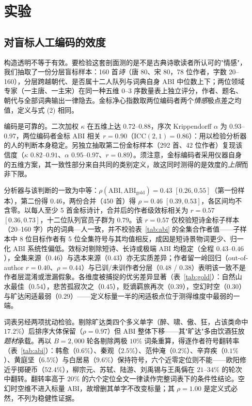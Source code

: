 \documentclass[11pt]{article}
\begin{document}
\section{实验}
\label{sec:profiles}

\subsection{对盲标人工编码的效度}
\label{sec:gold}

构造透明不等于有效。要检验这套剖面测的是不是古典诗歌读者所认可的"情感"，我们抽取了一份分层盲标样本：160 首\emph{诗}（唐 80、宋 80，78 位作者，字数 20–160），分层跨越朝代、是否属十二人队列与词典自身 ABI 中位数上下；两位领域专家（一主唐、一主宋）在同一种五维 0–3 序数量表上独立评分，作者、题名、朝代与全部词典输出一律隐去。金标净心指数取两位编码者两个\emph{情感}极点差之均值，定义与式 (2) 相同。

编码是可靠的。二次加权 $\kappa$ 在五维上达 $0.72$–$0.88$，序次 Krippendorff $\alpha$ 为 $0.93$–$0.97$，两位编码者金标 ABI 相关 $r{=}0.90$（ICC$(2,1){=}0.86$）：用以检验分析器的人的判断本身稳定。另独立抽取第二份金标样本（292 首、42 位作者）复现该信度（$\kappa$ $0.82$–$0.91$、$\alpha$ $0.95$–$0.97$、$r{=}0.89$）。须注意，金标编码者采用仪器自身的五维方案，其一致性部分来自共同的类别定义，故这同时测得的是效度的\emph{上限}而非下限。

分析器与该判断的一致为中等：$\rho(\mathrm{ABI},\mathrm{ABI}_{\mathrm{gold}}){=}0.43$ $[0.26,0.55]$（第一份样本），第二份得 $0.46$，两份合并（$450$ 首）得 $\rho{=}0.46$ $[0.39,0.53]$，各区间均不含零。以每人至少 5 首金标诗计，合并后的作者级效标相关为 $r{=}0.57$ $[0.36,0.73]$，十二位队列官员子群为 $0.79$。该 $r{=}0.57$ 仅校验短诗金标子样本（20–160 字）内的词典—人一致，并不校验表~\ref{tab:abi} 的全集合作者值——子样本中 8 位目标作者有 5 位全集符号与其均值相反，成因是短诗景物词更少、归一化 ABI 系统性偏低。效标对剔除短诗、长诗或极端 ABI 均稳定（全程 $0.43$–$0.46$），全集来源（$0.46$）与选本来源（$0.43$）亦无实质差异；作者留一岭回归（out-of-author $r{=}0.40$、$\rho{=}0.44$）与已训/未训作者分层（$0.48$ / $0.38$）表明该一致不是作者层混淆或泄漏假象。各维度被捕捉的优劣差异显著（表~\ref{tab:gold}）：自然山水最佳（$0.54$），悲苦孤寂次之（$0.45$），贬谪羁旅再次（$0.39$），空幻时空（$0.30$）与旷达闲适最弱（$0.29$）——定义标量一半的闲适极点位于测得维度中最弱的一端。

词表另经两项扰动检验。剔除旷达类四个多义单字（醉、啸、傲、狂，占该类命中 $17.2\%$）后排序大体保留（$\rho{=}0.97$）但 ABI 整体下移——其"旷达"多由饮酒狂放\emph{题材}承载。再以 $B{=}2{,}000$ 轮各剔除两极 $10\%$ 词条重算，得逐作者符号翻转率（表~\ref{tab:abi}）：韩愈（$0.6\%$）、秦观（$2.5\%$）、范仲淹（$0.2\%$）、辛弃疾（$0.1\%$）、黄庭坚（$6.5\%$）与白居易（$9.6\%$）保持符号，六个近零定位则不能——欧阳修近乎掷硬币（$52.4\%$），柳宗元、苏轼、陆游、刘禹锡与王禹偁在 $21$–$34\%$ 的轮次中翻转。翻转率高于 $20\%$ 的六个定位全文一律读作完整词表下的条件性结论。空幻时空维不进入标量 ABI，故增删其单字不改变标量；其 $\rho{=}1.00$ 是定义式必然，不列为稳健性证据。
\end{document}
